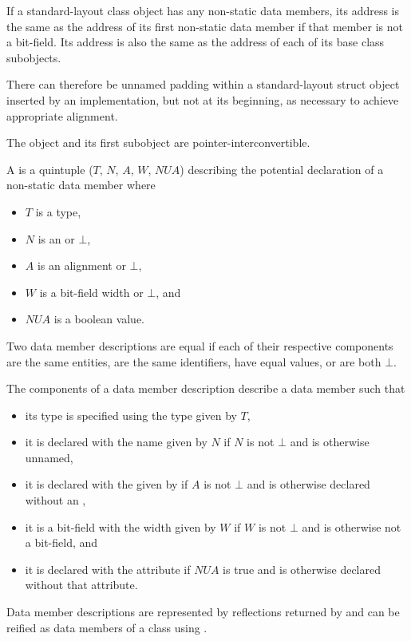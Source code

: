 \pnum
If a standard-layout class object has any non-static data members, its address
is the same as the address of its first non-static data member
if that member is not a bit-field. Its
address is also the same as the address of each of its base class subobjects.
\begin{note}
There can therefore be unnamed padding within a standard-layout struct object
inserted by an implementation, but
not at its beginning, as necessary to achieve appropriate alignment.
\end{note}
\begin{note}
The object and its first subobject are
pointer-interconvertible.
\end{note}

\pnum
A  is
a quintuple ($T$, $N$, $A$, $W$, $\mathit{NUA}$)
describing the potential declaration of a non-static data member where
\begin{itemize}
\item $T$ is a type,
\item $N$ is an  or $\bot$,
\item $A$ is an alignment or $\bot$,
\item $W$ is a bit-field width or $\bot$, and
\item $\mathit{NUA}$ is a boolean value.
\end{itemize}
Two data member descriptions are equal
if each of their respective components are the same entities,
are the same identifiers, have equal values, or are both $\bot$.
\begin{note}
The components of a data member description describe a data member such that
\begin{itemize}
\item
its type is specified using the type given by $T$,
\item
it is declared with the name given by $N$
if $N$ is not $\bot$ and is otherwise unnamed,
\item
it is declared with the 
given by 
if $A$ is not $\bot$ and
is otherwise declared without an ,
\item
it is a bit-field with the width given by $W$
if $W$ is not $\bot$ and is otherwise not a bit-field, and
\item
it is declared with
the attribute 
if $\mathit{NUA}$ is true and is otherwise declared without that attribute.
\end{itemize}
Data member descriptions are represented by reflections
returned by  and
can be reified as data members of a class using .
\end{note}

